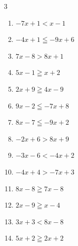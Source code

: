 \begin{multicols}{3}
\begin{enumerate}
  \item $-7x+1<x-1$


  \item $-4x+1\leqq -9x+6$

        \phantom{$\displaystyle x\leqq 1$}

  \item $7x-8>8x+1$

        \phantom{$\displaystyle x<-9$}

  \item $5x-1\geqq x+2$


  \item $2x+9\geqq 4x-9$

        \phantom{$\displaystyle x\leqq 9$}

\columnbreak %

  \item $9x-2\leqq -7x+8$


  \item $8x-7\leqq -9x+2$


  \item $-2x+6>8x+9$


  \item $-3x-6<-4x+2$

        \phantom{$\displaystyle x<8$}

  \item $-4x+4>-7x+3$


  \item $8x-8\geqq 7x-8$

        \phantom{$\displaystyle x\geqq 0$}

  \item $2x-9\geqq x-4$

        \phantom{$\displaystyle x\geqq 5$}

  \item $3x+3<8x-8$


  \item $5x+2\geqq 2x+2$


\end{enumerate}
\end{multicols}
